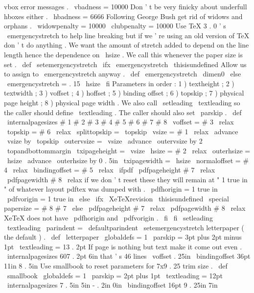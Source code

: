 {{{{vbox
error
messages
.
\
vbadness
=
10000
%
Don
'
t
be
very
finicky
about
underfull
hboxes
either
.
\
hbadness
=
6666
%
Following
George
Bush
get
rid
of
widows
and
orphans
.
\
widowpenalty
=
10000
\
clubpenalty
=
10000
%
Use
TeX
3
.
0
'
s
\
emergencystretch
to
help
line
breaking
but
if
we
'
re
%
using
an
old
version
of
TeX
don
'
t
do
anything
.
We
want
the
amount
of
%
stretch
added
to
depend
on
the
line
length
hence
the
dependence
on
%
\
hsize
.
We
call
this
whenever
the
paper
size
is
set
.
%
\
def
\
setemergencystretch
{
%
\
ifx
\
emergencystretch
\
thisisundefined
%
Allow
us
to
assign
to
\
emergencystretch
anyway
.
\
def
\
emergencystretch
{
\
dimen0
}
%
\
else
\
emergencystretch
=
.
15
\
hsize
\
fi
}
%
Parameters
in
order
:
1
)
textheight
;
2
)
textwidth
;
%
3
)
voffset
;
4
)
hoffset
;
5
)
binding
offset
;
6
)
topskip
;
%
7
)
physical
page
height
;
8
)
physical
page
width
.
%
%
We
also
call
\
setleading
{
\
textleading
}
so
the
caller
should
define
%
\
textleading
.
The
caller
should
also
set
\
parskip
.
%
\
def
\
internalpagesizes
#
1
#
2
#
3
#
4
#
5
#
6
#
7
#
8
{
%
\
voffset
=
#
3
\
relax
\
topskip
=
#
6
\
relax
\
splittopskip
=
\
topskip
%
\
vsize
=
#
1
\
relax
\
advance
\
vsize
by
\
topskip
\
outervsize
=
\
vsize
\
advance
\
outervsize
by
2
\
topandbottommargin
\
txipageheight
=
\
vsize
%
\
hsize
=
#
2
\
relax
\
outerhsize
=
\
hsize
\
advance
\
outerhsize
by
0
.
5in
\
txipagewidth
=
\
hsize
%
\
normaloffset
=
#
4
\
relax
\
bindingoffset
=
#
5
\
relax
%
\
ifpdf
\
pdfpageheight
#
7
\
relax
\
pdfpagewidth
#
8
\
relax
%
if
we
don
'
t
reset
these
they
will
remain
at
"
1
true
in
"
of
%
whatever
layout
pdftex
was
dumped
with
.
\
pdfhorigin
=
1
true
in
\
pdfvorigin
=
1
true
in
\
else
\
ifx
\
XeTeXrevision
\
thisisundefined
\
special
{
papersize
=
#
8
#
7
}
%
\
else
\
pdfpageheight
#
7
\
relax
\
pdfpagewidth
#
8
\
relax
%
XeTeX
does
not
have
\
pdfhorigin
and
\
pdfvorigin
.
\
fi
\
fi
%
\
setleading
{
\
textleading
}
%
\
parindent
=
\
defaultparindent
\
setemergencystretch
}
%
letterpaper
(
the
default
)
.
\
def
\
letterpaper
{
{
\
globaldefs
=
1
\
parskip
=
3pt
plus
2pt
minus
1pt
\
textleading
=
13
.
2pt
%
%
If
page
is
nothing
but
text
make
it
come
out
even
.
\
internalpagesizes
{
607
.
2pt
}
{
6in
}
%
that
'
s
46
lines
{
\
voffset
}
{
.
25in
}
%
{
\
bindingoffset
}
{
36pt
}
%
{
11in
}
{
8
.
5in
}
%
}
}
%
Use
smallbook
to
reset
parameters
for
7x9
.
25
trim
size
.
\
def
\
smallbook
{
{
\
globaldefs
=
1
\
parskip
=
2pt
plus
1pt
\
textleading
=
12pt
%
\
internalpagesizes
{
7
.
5in
}
{
5in
}
%
{
-
.
2in
}
{
0in
}
%
{
\
bindingoffset
}
{
16pt
}
%
{
9
.
25in
}
{
7in
}}}}}}}
